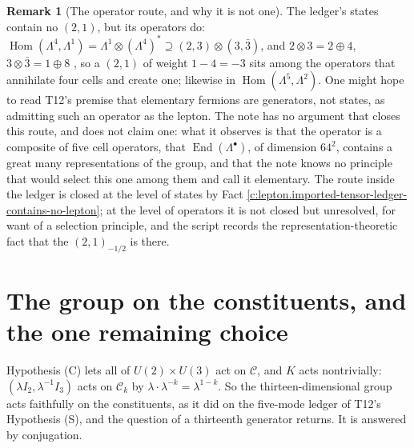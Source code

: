 \documentclass[11pt]{article}
\theoremstyle{definition}
\newtheorem{remark}[theorem]{Remark}
\theoremstyle{plain}
\providecommand{\Con}{}\renewcommand{\Con}{\mathcal{C}}
\begin{document}
\begin{remark}[The operator route, and why it is not one]\label{c:note.lepton.operator-route-why-it-not-one}
The ledger's states contain no $(2,1)$, but its operators do: $\operatorname{Hom}(\Lambda^{4}, \Lambda^{1}) = \Lambda^{1} \otimes (\Lambda^{4})^{*} \supseteq (2,3) \otimes (3,\bar{3})$, and $2 \otimes 3 = 2 \oplus 4$, $3 \otimes \bar{3} = 1 \oplus 8$ \cite[\S 11.2, \S 13.2]{FultonHarris1991}, so a $(2,1)$ of weight $1 - 4 = -3$ sits among the operators that annihilate four cells and create one; likewise in $\operatorname{Hom}(\Lambda^{5}, \Lambda^{2})$. One might hope to read T12's premise that elementary fermions are generators, not states, as admitting such an operator as the lepton. The note has no argument that closes this route, and does not claim one: what it observes is that the operator is a composite of five cell operators, that $\operatorname{End}(\Lambda^{\bullet})$, of dimension $64^{2}$, contains a great many representations of the group, and that the note knows no principle that would select this one among them and call it elementary. The route inside the ledger is closed at the level of states by Fact \ref{c:lepton.imported-tensor-ledger-contains-no-lepton}; at the level of operators it is not closed but unresolved, for want of a selection principle, and the script records the representation-theoretic fact that the $(2,1)_{-1/2}$ is there.
\end{remark}

\section{The group on the constituents, and the one remaining choice}

\label{c:note.lepton.setting-group-constituents-one-remaining-choice}
Hypothesis (C) lets all of $U(2) \times U(3)$ act on $\Con$, and $K$ acts nontrivially: $(\lambda I_{2}, \lambda^{-1}I_{3})$ acts on $\Con_{k}$ by $\lambda \cdot \lambda^{-k} = \lambda^{1-k}$. So the thirteen-dimensional group acts faithfully on the constituents, as it did on the five-mode ledger of T12's Hypothesis (S), and the question of a thirteenth generator returns. It is answered by conjugation.
\end{document}
